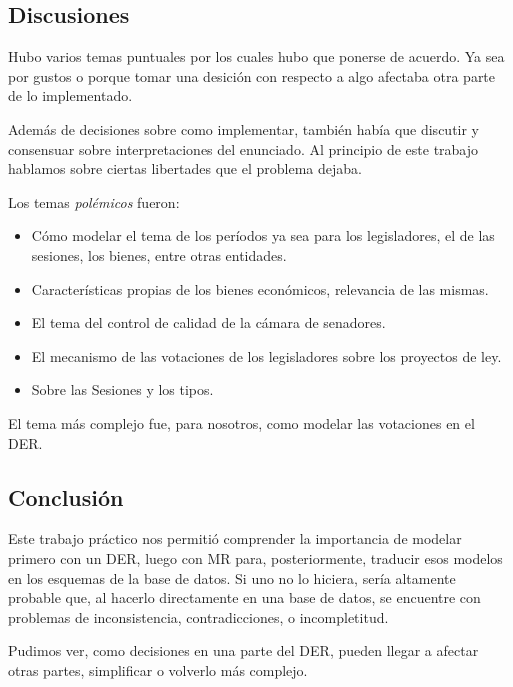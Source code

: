 \subsection{Discusiones}

\quad Hubo varios temas puntuales por los cuales hubo que ponerse de acuerdo. Ya sea por gustos o porque tomar una desici\'on con respecto a algo afectaba otra parte de lo implementado.

\quad Adem\'as de decisiones sobre como implementar, tambi\'en hab\'ia que discutir y consensuar sobre interpretaciones del enunciado. Al principio de este trabajo hablamos sobre ciertas libertades que el problema dejaba.

\quad Los temas \textit{pol\'emicos} fueron:

\begin{itemize}
  \item C\'omo modelar el tema de los per\'iodos ya sea para los legisladores, el de las sesiones, los bienes, entre otras entidades.
  
  
  \item Caracter\'isticas propias de los bienes econ\'omicos, relevancia de las mismas.
  
  
  \item El tema del control de calidad de la c\'amara de senadores.
  
  
  \item El mecanismo de las votaciones de los legisladores sobre los proyectos de ley.
  
  
  \item Sobre las Sesiones y los tipos.
\end{itemize}

\quad El tema m\'as complejo fue, para nosotros, como modelar las votaciones en el DER.

\subsection{Conclusi\'on}

\quad Este trabajo pr\'actico nos permiti\'o comprender la importancia de modelar primero con un DER, luego con MR para, posteriormente, traducir esos modelos en los esquemas de la base de datos. Si uno no lo hiciera, ser\'ia altamente probable que, al hacerlo directamente en una base de datos, se encuentre con problemas de inconsistencia, contradicciones, o incompletitud.

\quad Pudimos ver, como decisiones en una parte del DER, pueden llegar a afectar otras partes, simplificar o volverlo m\'as complejo.